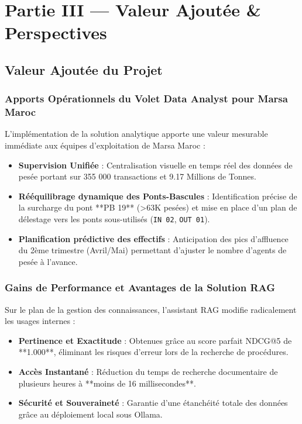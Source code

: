 \documentclass[12pt,a4paper,oneside]{report}
\begin{document}
\chapter{Partie III — Valeur Ajoutée \& Perspectives}

\section{Valeur Ajoutée du Projet}

\subsection{Apports Opérationnels du Volet Data Analyst pour Marsa Maroc}
L'implémentation de la solution analytique apporte une valeur mesurable immédiate aux équipes d'exploitation de Marsa Maroc :
\begin{itemize}
    \item \textbf{Supervision Unifiée} : Centralisation visuelle en temps réel des données de pesée portant sur 355 000 transactions et 9.17 Millions de Tonnes.
    \item \textbf{Rééquilibrage dynamique des Ponts-Bascules} : Identification précise de la surcharge du pont **PB 19** (>63K pesées) et mise en place d'un plan de délestage vers les ponts sous-utilisés (\texttt{IN 02}, \texttt{OUT 01}).
    \item \textbf{Planification prédictive des effectifs} : Anticipation des pics d'affluence du 2ème trimestre (Avril/Mai) permettant d'ajuster le nombre d'agents de pesée à l'avance.
\end{itemize}

\subsection{Gains de Performance et Avantages de la Solution RAG}
Sur le plan de la gestion des connaissances, l'assistant RAG modifie radicalement les usages internes :
\begin{itemize}
    \item \textbf{Pertinence et Exactitude} : Obtenues grâce au score parfait NDCG@5 de **1.000**, éliminant les risques d'erreur lors de la recherche de procédures.
    \item \textbf{Accès Instantané} : Réduction du temps de recherche documentaire de plusieurs heures à **moins de 16 millisecondes**.
    \item \textbf{Sécurité et Souveraineté} : Garantie d'une étanchéité totale des données grâce au déploiement local sous Ollama.
\end{itemize}
\end{document}
